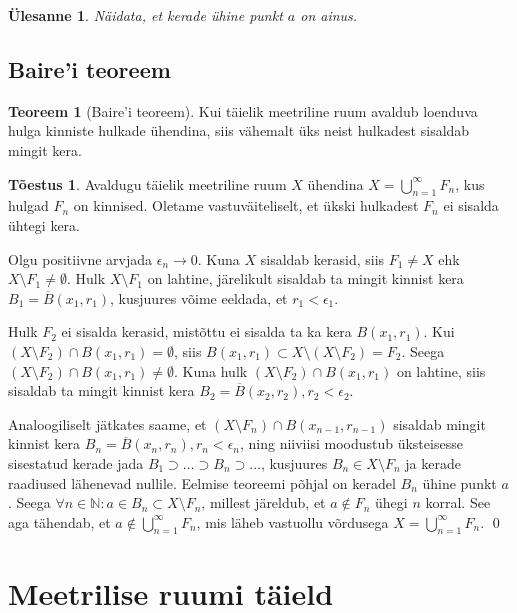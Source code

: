 \documentclass{article}[12pt]
\newcommand{\N}{\mathbb{N}}
\newtheorem{yl}{Ülesanne}[section]
\theoremstyle{definition}
\theoremstyle{definition}
\newtheorem{theorem}{Teoreem}[section]
\theoremstyle{definition}
\theoremstyle{break}
\newtheorem*{toestus}{Tõestus}
\begin{document}
\begin{yl}
	Näidata, et kerade ühine punkt $a$ on ainus.
\end{yl}

\subsection{Baire'i teoreem}

\begin{theorem}[Baire'i teoreem]
	Kui täielik meetriline ruum avaldub loenduva hulga kinniste hulkade ühendina, siis vähemalt üks neist hulkadest sisaldab mingit kera.
\end{theorem}
\begin{toestus}
	Avaldugu täielik meetriline ruum $X$ ühendina $X=\bigcup_{n=1}^\infty F_n$, kus hulgad $F_n$ on kinnised. Oletame vastuväiteliselt, et ükski hulkadest $F_n$ ei sisalda ühtegi kera.

	Olgu positiivne arvjada $\epsilon_n \rightarrow 0$. Kuna $X$ sisaldab kerasid, siis $F_1\neq X$ ehk $X\setminus F_1\neq \emptyset$. Hulk $X\setminus F_1$ on lahtine, järelikult sisaldab ta mingit kinnist kera $B_1 = \overline{B}(x_1,r_1)$, kusjuures võime eeldada, et $r_1 < \epsilon_1$.

	Hulk $F_2$ ei sisalda kerasid, mistõttu ei sisalda ta ka kera $B(x_1,r_1)$. Kui $(X\setminus F_2)\cap B(x_1,r_1) = \emptyset$, siis $B(x_1,r_1)\subset X\setminus(X\setminus F_2) = F_2$. Seega $(X\setminus F_2)\cap B(x_1,r_1)\neq \emptyset$. Kuna hulk $(X\setminus F_2)\cap B(x_1,r_1)$ on lahtine, siis sisaldab ta mingit kinnist kera $B_2 = \overline{B}(x_2,r_2), r_2 < \epsilon_2$.

	Analoogiliselt jätkates saame, et $(X\setminus F_n)\cap B(x_{n-1},r_{n-1})$ sisaldab mingit kinnist kera $B_n = \overline{B}(x_n,r_n),r_n < \epsilon_n$, ning niiviisi moodustub üksteisesse sisestatud kerade jada $B_1\supset \dots\supset B_n\supset \dots$, kusjuures $B_n\in X\setminus F_n$ ja kerade raadiused lähenevad nullile. Eelmise teoreemi põhjal on keradel $B_n$ ühine punkt $a$. Seega $\forall n\in\N: a\in B_n\subset X\setminus F_n$, millest järeldub, et $a\notin F_n$ ühegi $n$ korral. See aga tähendab, et $a\notin \bigcup_{n=1}^\infty F_n$, mis läheb vastuollu võrdusega $X=\bigcup_{n=1}^\infty F_n$.
	\qed
\end{toestus}

\section{Meetrilise ruumi täield}
\end{document}
